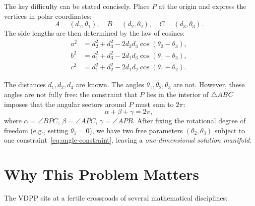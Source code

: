 The key difficulty can be stated concisely. Place $P$ at the origin and express the vertices in polar coordinates:
\begin{equation}
\label{eq:polar-setup}
A = (d_1, \theta_1), \quad B = (d_2, \theta_2), \quad C = (d_3, \theta_3).
\end{equation}
The side lengths are then determined by the law of cosines:
\begin{align}
a^2 &= d_2^2 + d_3^2 - 2d_2 d_3 \cos(\theta_2 - \theta_3), \label{eq:side-a} \\
b^2 &= d_1^2 + d_3^2 - 2d_1 d_3 \cos(\theta_1 - \theta_3), \label{eq:side-b} \\
c^2 &= d_1^2 + d_2^2 - 2d_1 d_2 \cos(\theta_1 - \theta_2). \label{eq:side-c}
\end{align}

The distances $d_1, d_2, d_3$ are known. The angles $\theta_1, \theta_2, \theta_3$ are not. However, these angles are not fully free: the constraint that $P$ lies in the interior of $\triangle ABC$ imposes that the angular sectors around $P$ must sum to $2\pi$:
\begin{equation}
\label{eq:angle-constraint}
\alpha + \beta + \gamma = 2\pi,
\end{equation}
where $\alpha = \angle BPC$, $\beta = \angle APC$, $\gamma = \angle APB$. After fixing the rotational degree of freedom (e.g., setting $\theta_1 = 0$), we have two free parameters $(\theta_2, \theta_3)$ subject to one constraint~\eqref{eq:angle-constraint}, leaving a \emph{one-dimensional solution manifold}.

\section{Why This Problem Matters}

The VDPP sits at a fertile crossroads of several mathematical disciplines:

